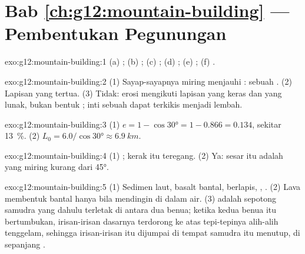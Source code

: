 \section*{Bab \ref{ch:g12:mountain-building} --- Pembentukan Pegunungan}

\begin{solution}{exo:g12:mountain-building:1}
(a) ; (b) ; (c) ; (d) ; (e) ;
(f) .
\end{solution}

\begin{solution}{exo:g12:mountain-building:2}
(1) Sayap-sayapnya miring menjauhi : sebuah . (2) Lapisan
yang tertua. (3) Tidak: erosi mengikuti lapisan yang keras dan yang lunak,
bukan bentuk ; inti sebuah  dapat terkikis menjadi lembah.
\end{solution}

\begin{solution}{exo:g12:mountain-building:3}
(1) $e = 1 - \cos\ang{30} = 1 - 0.866 = 0.134$, sekitar \qty{13}{\percent}.
(2) $L_0 = 6.0/\cos\ang{30} \approx \qty{6.9}{km}$.
\end{solution}

\begin{solution}{exo:g12:mountain-building:4}
(1) ; kerak itu teregang. (2) Ya: sesar itu adalah  yang
miring kurang dari \ang{45}.
\end{solution}

\begin{solution}{exo:g12:mountain-building:5}
(1) Sedimen laut, basalt bantal,  berlapis, , . (2) Lava
membentuk bantal hanya bila mendingin di dalam air. (3)  adalah
sepotong samudra yang dahulu terletak di antara dua benua; ketika kedua benua
itu bertumbukan, irisan-irisan dasarnya terdorong ke atas tepi-tepinya
alih-alih tenggelam, sehingga irisan-irisan itu dijumpai di tempat samudra itu
menutup, di sepanjang .
\end{solution}

